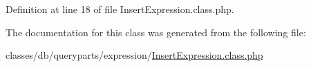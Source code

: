 Definition at line 18 of file Insert\+Expression.\+class.\+php.



The documentation for this class was generated from the following file\+:\begin{DoxyCompactItemize}
\item 
classes/db/queryparts/expression/\hyperlink{InsertExpression_8class_8php}{Insert\+Expression.\+class.\+php}\end{DoxyCompactItemize}
